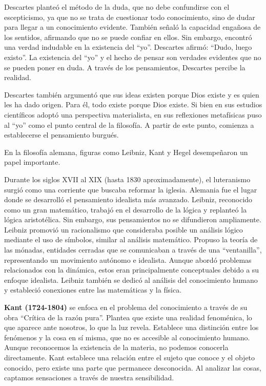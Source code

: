 \documentclass[
  jou,
  floatsintext,
  longtable,
  a4paper,
  nolmodern,
  notxfonts,
  notimes,
  12pt,
  colorlinks=true,linkcolor=blue,citecolor=blue,urlcolor=blue]{apa7}
\begin{document}
Descartes planteó el método de la duda, que no debe confundirse con el
escepticismo, ya que no se trata de cuestionar todo conocimiento, sino
de dudar para llegar a un conocimiento evidente. También señaló la
capacidad engañosa de los sentidos, afirmando que no se puede confiar en
ellos. Sin embargo, encontró una verdad indudable en la existencia del
``yo''. Descartes afirmó: ``Dudo, luego existo''. La existencia del
``yo'' y el hecho de pensar son verdades evidentes que no se pueden
poner en duda. A través de los pensamientos, Descartes percibe la
realidad.

Descartes también argumentó que sus ideas existen porque Dios existe y
es quien les ha dado origen. Para él, todo existe porque Dios existe. Si
bien en sus estudios científicos adoptó una perspectiva materialista, en
sus reflexiones metafísicas puso al ``yo'' como el punto central de la
filosofía. A partir de este punto, comienza a establecerse el
pensamiento burgués.

En la filosofía alemana, figuras como Leibniz, Kant y Hegel desempeñaron
un papel importante.

Durante los siglos XVII al XIX (hasta 1830 aproximadamente), el
luteranismo surgió como una corriente que buscaba reformar la iglesia.
Alemania fue el lugar donde se desarrolló el pensamiento idealista más
avanzado. Leibniz, reconocido como un gran matemático, trabajó en el
desarrollo de la lógica y replanteó la lógica aristotélica. Sin embargo,
sus pensamientos no se difundieron ampliamente. Leibniz promovió un
racionalismo que consideraba posible un análisis lógico mediante el uso
de símbolos, similar al análisis matemático. Propuso la teoría de las
mónadas, entidades cerradas que se comunicaban a través de una
``ventanilla'', representando un movimiento autónomo e idealista. Aunque
abordó problemas relacionados con la dinámica, estos eran principalmente
conceptuales debido a su enfoque idealista. Leibniz también se dedicó al
análisis del conocimiento humano y estableció conexiones entre las
matemáticas y la física.

\textbf{Kant (1724-1804)} se enfoca en el problema del conocimiento a
través de su obra ``Crítica de la razón pura''. Plantea que existe una
realidad fenoménica, lo que aparece ante nosotros, lo que la luz revela.
Establece una distinción entre los fenómenos y la cosa en sí misma, que
no es accesible al conocimiento humano. Aunque reconocemos la existencia
de la materia, no podemos conocerla directamente. Kant establece una
relación entre el sujeto que conoce y el objeto conocido, pero existe
una parte que permanece desconocida. Al analizar las cosas, captamos
sensaciones a través de nuestra sensibilidad.
\end{document}
